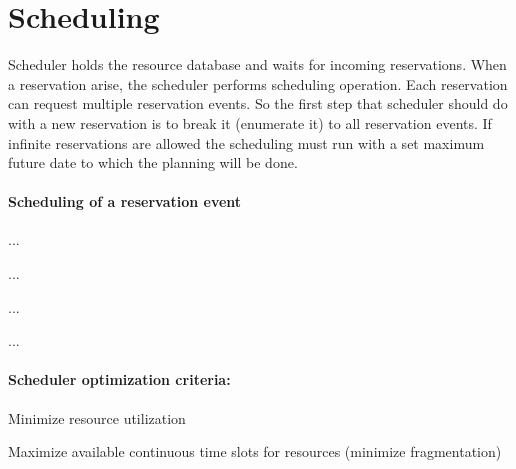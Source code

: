 \section{Scheduling}

Scheduler holds the resource database and waits for incoming reservations. When a reservation arise, the scheduler performs scheduling operation. Each reservation can request multiple reservation events. So the first step that
scheduler should do with a new reservation is to break it (enumerate it) to
all reservation events. If infinite reservations are allowed the scheduling must run with a set maximum future date to which the planning will be done.

\paragraph{Scheduling of a reservation event}
{
\renewcommand{\labelenumi}{\arabic{enumi}.}
\renewcommand{\labelenumii}{\arabic{enumi}.\arabic{enumii}}
\begin{compactenum}
\item ...
  \begin{compactenum}
  \item ...
  \item ...
  \end{compactenum}
\item ...
\end{compactenum}
}



\paragraph{Scheduler optimization criteria:}
\begin{compactitem}
\item Minimize resource utilization
\item Maximize available continuous time slots for resources (minimize 
  fragmentation)
\end{compactitem}
